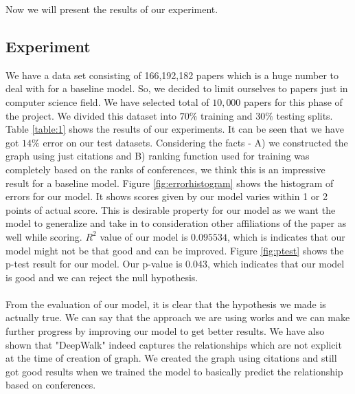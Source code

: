 \documentclass[a4paper, 11pt]{article}
\begin{document}
Now we will present the results of our experiment. 
\subsection{Experiment}
We have a data set consisting of 166,192,182 papers which is a huge number to deal with for a baseline model. So, we decided to limit ourselves to papers just in computer science field. We have selected total of $10,000$ papers for this phase of the project. We divided this dataset into $70\%$ training and $30\%$ testing splits. Table \ref{table:1} shows the results of our experiments. It can be seen that we have got $14\%$ error on our test datasets. Considering the facts - A) we constructed the graph using just citations and B) ranking function used for training was completely based on the ranks of conferences, we think this is an impressive result for a baseline model. Figure \ref{fig:errorhistogram} shows the histogram of errors for our model. It shows scores given by our model varies within 1 or 2 points of actual score. This is desirable property for our model as we want the model to generalize and take in to consideration other affiliations of the paper as well while scoring. $R^2$ value of our model is $0.095534$, which is indicates that our model might not be that good and can be improved. Figure \ref{fig:ptest} shows the p-test result for our model. Our p-value is 0.043, which indicates that our model is good and we can reject the null hypothesis.  \\
\\From the evaluation of our model, it is clear that the hypothesis we made is actually true. We can say that the approach we are using works and we can make further progress by improving our model to get better results. We have also shown that "DeepWalk" indeed captures the relationships which are not explicit at the time of creation of graph. We created the graph using citations and still got good results when we trained the model to basically predict the relationship based on conferences. 
\end{document}
